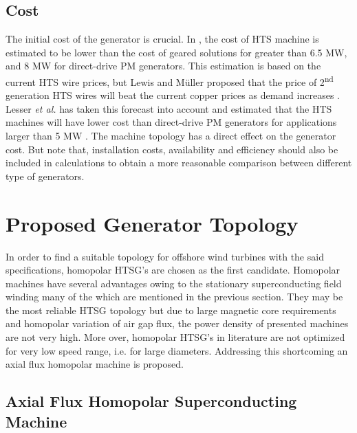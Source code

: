 \documentclass[final,peerreview,onecolumn]{IEEEtran}
\begin{document}
\subsection{Cost}

The initial cost of the generator is crucial. In \cite{Maples2010}, the cost of HTS machine is estimated to be lower than the cost of geared solutions for greater than 6.5 MW, and 8 MW for direct-drive PM generators. This estimation is based on the current HTS wire prices, but Lewis and M\"{u}ller proposed that the price of  2\textsuperscript{nd} generation HTS wires will beat the current copper prices as demand increases \cite{Lewis2007}. Lesser \textit{et al.} has taken this forecast into account and estimated that the HTS machines will have lower cost than direct-drive PM generators for applications larger than 5 MW \cite{Lesser2009}. The machine topology has a direct effect on the generator cost. But note that, installation costs, availability and efficiency should also be included in calculations to obtain a more reasonable comparison between different type of generators.


\section{Proposed Generator Topology}


In order to find a suitable topology for offshore wind turbines with the said specifications, homopolar HTSG's are chosen as the first candidate. Homopolar machines have several advantages owing to the stationary superconducting field winding \cite{Gieras2008a,Lee2008} many of the which are mentioned in the previous section.  They may be the most reliable HTSG topology but due to large magnetic core requirements and homopolar variation of air gap flux, the power density of presented machines are not very high. More over, homopolar HTSG's in literature are not optimized for very low speed range, i.e. for large diameters. Addressing this shortcoming an axial flux homopolar machine is proposed.

\subsection{Axial Flux Homopolar Superconducting Machine}
\end{document}

